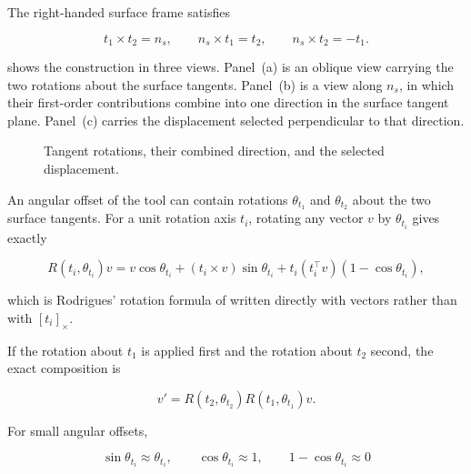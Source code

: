 
The right-handed surface frame satisfies

\begin{equation}
t_1\times t_2=n_s,
\qquad
n_s\times t_1=t_2,
\qquad
n_s\times t_2=-t_1.
\label{eq:surface_frame_cross_product_relations}
\end{equation}

\mbox{} shows the construction in three
views. Panel~(a) is an oblique view carrying the two rotations about the
surface tangents. Panel~(b) is a view along \mbox{\(n_s\)}, in which their
first-order contributions combine into one direction in the surface tangent
plane. Panel~(c) carries the displacement selected perpendicular to that
direction.

\begin{figure}[H]
  \centering
  
  \caption{Tangent rotations, their combined direction, and the selected displacement.}
  \label{fig:lever_direction_selection}
\end{figure}

An angular offset of the tool can contain rotations \mbox{\(\theta_{t_1}\)}
and \mbox{\(\theta_{t_2}\)} about the two surface tangents. For a unit rotation
axis \mbox{\(t_i\)}, rotating any vector \mbox{\(v\)} by
\mbox{\(\theta_{t_i}\)} gives exactly

\begin{equation}
R(t_i,\theta_{t_i})v
=
v\cos\theta_{t_i}
+(t_i\times v)\sin\theta_{t_i}
+t_i(t_i^\top v)(1-\cos\theta_{t_i}),
\label{eq:rodrigues_vector_form}
\end{equation}

which is Rodrigues' rotation formula of
\mbox{} written directly with vectors rather than
with \mbox{\([t_i]_\times\)}.

If the rotation about \mbox{\(t_1\)} is applied first and the rotation about
\mbox{\(t_2\)} second, the exact composition is

\begin{equation}
v'
=
R(t_2,\theta_{t_2})R(t_1,\theta_{t_1})v.
\label{eq:tangent_rotation_composition}
\end{equation}

For small angular offsets,

\[
\sin\theta_{t_i}\approx\theta_{t_i},
\qquad
\cos\theta_{t_i}\approx1,
\qquad
1-\cos\theta_{t_i}\approx0
\]

